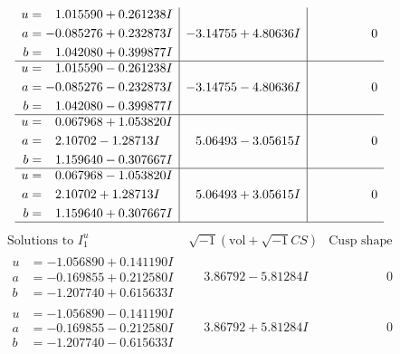 \documentclass[1p]{elsarticle_modified}
\theoremstyle{definition}
\newcommand{\I}{\sqrt{-1}}
\begin{document}
$$\begin{array}{c|c|c}
\begin{aligned}
u &= \phantom{-}1.015590 + 0.261238 I \\
a &= -0.085276 + 0.232873 I \\
b &= \phantom{-}1.042080 + 0.399877 I\end{aligned}
 & -3.14755 + 4.80636 I & \phantom{-0.000000 } 0 \\ \hline\begin{aligned}
u &= \phantom{-}1.015590 - 0.261238 I \\
a &= -0.085276 - 0.232873 I \\
b &= \phantom{-}1.042080 - 0.399877 I\end{aligned}
 & -3.14755 - 4.80636 I & \phantom{-0.000000 } 0 \\ \hline\begin{aligned}
u &= \phantom{-}0.067968 + 1.053820 I \\
a &= \phantom{-}2.10702 - 1.28713 I \\
b &= \phantom{-}1.159640 - 0.307667 I\end{aligned}
 & \phantom{-}5.06493 - 3.05615 I & \phantom{-0.000000 } 0 \\ \hline\begin{aligned}
u &= \phantom{-}0.067968 - 1.053820 I \\
a &= \phantom{-}2.10702 + 1.28713 I \\
b &= \phantom{-}1.159640 + 0.307667 I\end{aligned}
 & \phantom{-}5.06493 + 3.05615 I & \phantom{-0.000000 } 0\\
 \hline 
 \end{array}$$\newpage$$\begin{array}{c|c|c}  
\text{Solutions to }I^u_{1}& \I (\text{vol} + \sqrt{-1}CS) & \text{Cusp shape}\\
 \hline 
\begin{aligned}
u &= -1.056890 + 0.141190 I \\
a &= -0.169855 + 0.212580 I \\
b &= -1.207740 + 0.615633 I\end{aligned}
 & \phantom{-}3.86792 - 5.81284 I & \phantom{-0.000000 } 0 \\ \hline\begin{aligned}
u &= -1.056890 - 0.141190 I \\
a &= -0.169855 - 0.212580 I \\
b &= -1.207740 - 0.615633 I\end{aligned}
 & \phantom{-}3.86792 + 5.81284 I & \phantom{-0.000000 } 0 \\ \hline\begin{aligned}

\end{aligned}
\end{array}$$
\end{document}
